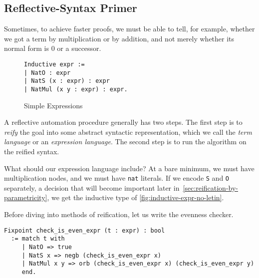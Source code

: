 \subsection{Reflective-Syntax Primer}
Sometimes, to achieve faster proofs, we must be able to tell, for example, whether we got a term by multiplication or by addition, and not merely whether its normal form is 0 or a successor.%

\begin{wrapfigure}[4]{r}{5cm}
\begin{verbatim}
Inductive expr :=
| NatO : expr
| NatS (x : expr) : expr
| NatMul (x y : expr) : expr.
\end{verbatim}
\caption{Simple Expressions}\label{fig:inductive-expr-no-letin}
\end{wrapfigure}

A reflective automation procedure generally has two steps.
The first step is to \emph{reify} the goal into some abstract syntactic representation, which we call the \emph{term language} or an \emph{expression language}.
The second step is to run the algorithm on the reified syntax.

What should our expression language include?
At a bare minimum, we must have multiplication nodes, and we must have \texttt{nat} literals.
If we encode \texttt{S} and \texttt{O} separately, a decision that will become important later in~\autoref{sec:reification-by-parametricity}, we get the inductive type of \autoref{fig:inductive-expr-no-letin}.

Before diving into methods of reification, let us write the evenness checker.
\begin{verbatim}
Fixpoint check_is_even_expr (t : expr) : bool
  := match t with
     | NatO => true
     | NatS x => negb (check_is_even_expr x)
     | NatMul x y => orb (check_is_even_expr x) (check_is_even_expr y)
     end.
\end{verbatim}

